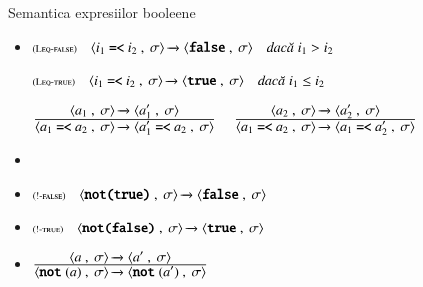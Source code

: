\documentclass[xcolor=pdftex,romanian,colorlinks]{beamer}
\begin{document}
\begin{frame}[fragile]{Semantica expresiilor booleene}
\vspace*{0.5cm}
 
  \begin{itemize}
 

 \item {}
 
 	\smallskip
    $\reg[Leq-false]{\Ss{\Conf{i_1 \terminal{=<} i_2}{\sigma}}  {\Conf{\terminal{false}}{\sigma}}}{}{i_1 > i_2}$
    
    \smallskip
   $\reg[Leq-true]{\Ss{\Conf{i_1 \terminal{=<} i_2}{\sigma}}   {\Conf{\terminal{true}}{\sigma}}}{}{i_1 \leq i_2}$

\bigskip  

 $\reg{\Ss{\Conf{a_1 \terminal{=<} a_2}{\sigma}}  {\Conf{a_1' \terminal{=<} a_2}{\sigma}}}{\Ss{\Conf{a_1}{\sigma}}  {\Conf{a_1'}{\sigma}}}{}\,\,\reg{\Ss{\Conf{a_1 \terminal{=<} a_2}{\sigma}}  {\Conf{a_1 \terminal{=<} a_2'}{\sigma}}}{\Ss{\Conf{a_2}{\sigma}}  {\Conf{a_2'}{\sigma}}}{}$
 
    \bigskip
  \item {} 
   
  \item[] $\reg[!-false]{\Ss{\Conf{\terminal{not(} \terminal{true)}}{\sigma}}  {\Conf{\terminal{false}}{\sigma}}}{}{}$
    
  \item[] $\reg[!-true]{\Ss{\Conf{\terminal{not(} \terminal{false)}}{\sigma}}  {\Conf{\terminal{true}}{\sigma}}}{}{}$
   \bigskip  
  \item[] $\reg{\Ss{\Conf{\terminal{not}(a)}{\sigma}}  {\Conf{\terminal{not}(a')}{\sigma}}}{\Ss{\Conf{a}{\sigma}}  {\Conf{a'}{\sigma}}}{}$
\end{itemize}
 

\end{frame}
\end{document}

